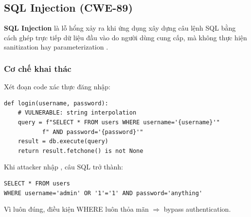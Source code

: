 \documentclass{nt521report}
\begin{document}
\subsection{SQL Injection (CWE-89)}
\label{sec:sql-injection}

\begin{defbox}[title={Định nghĩa SQL Injection}]
  \textbf{SQL Injection} là lỗ hổng xảy ra khi ứng dụng xây dựng câu lệnh SQL bằng cách ghép trực tiếp dữ liệu đầu vào do người dùng cung cấp, mà không thực hiện sanitization hay parameterization \cite{halfond2006classification, clarke2012sql}.
\end{defbox}

\subsubsection{Cơ chế khai thác}

Xét đoạn code xác thực đăng nhập:

\begin{lstlisting}[style=Python, caption={Ví dụ code có lỗ hổng SQL Injection}]
def login(username, password):
    # VULNERABLE: string interpolation
    query = f"SELECT * FROM users WHERE username='{username}'"
           f" AND password='{password}'"
    result = db.execute(query)
    return result.fetchone() is not None
\end{lstlisting}

Khi attacker nhập , câu SQL trở thành:

\begin{lstlisting}[style=Python, caption={Câu SQL sau khi bị inject}]
SELECT * FROM users
WHERE username='admin' OR '1'='1' AND password='anything'
\end{lstlisting}

Vì  luôn đúng, điều kiện WHERE luôn thỏa mãn $\Rightarrow$ bypass authentication.
\end{document}
